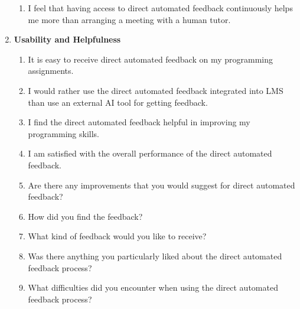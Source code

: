 \documentclass[manuscript,screen,review, anonymous]{acmart}
\begin{document}
\begin{enumerate}[label=\textbf{RQ\arabic*}]
\begin{enumerate}[label=\textbf{Q\arabic*},resume,ref=Q\arabic*]
      \item \label{Q13} I feel that having access to direct automated feedback continuously helps me more than arranging a meeting with a human tutor.
    \end{enumerate}
  \item \textbf{Usability and Helpfulness}
    \begin{enumerate}[label=\textbf{Q\arabic*},resume,ref=Q\arabic*]
      \item \label{Q14} It is easy to receive direct automated feedback  on my programming assignments.
      \item \label{Q15} I would rather use the direct automated feedback integrated into LMS than use an external AI tool for getting feedback.
      \item \label{Q16} I find the direct automated feedback helpful in improving my programming skills.
      \item \label{Q17} I am satisfied with the overall performance of the direct automated feedback.
      \item \label{Q18} Are there any improvements that you would suggest for direct automated feedback?
      \item \label{Q19} How did you find the feedback?
      \item \label{Q20} What kind of feedback would you like to receive?
      \item \label{Q21} Was there anything you particularly liked about the direct automated feedback process?
      \item \label{Q22} What difficulties did you encounter when using the direct automated feedback process?
    \end{enumerate}
\end{enumerate}



\end{document}
